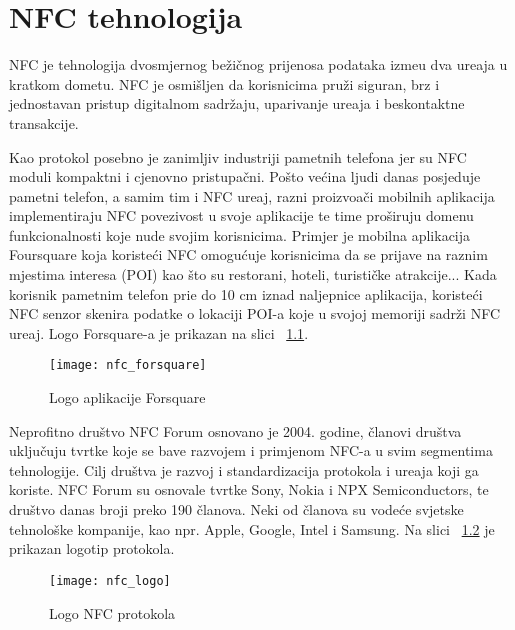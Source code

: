 
\chapter{NFC tehnologija}
NFC je tehnologija dvosmjernog be\v{z}i\v{c}nog prijenosa podataka izme\dj u dva ure\dj aja u kratkom dometu. NFC je osmi\v{s}ljen da korisnicima pru\v{z}i siguran, brz i jednostavan pristup digitalnom sadr\v{z}aju, uparivanje ure\dj aja i beskontaktne transakcije.

Kao protokol posebno je zanimljiv industriji pametnih telefona jer su NFC moduli kompaktni i cjenovno pristupa\v{c}ni. Po\v{s}to ve\'{c}ina ljudi danas posjeduje pametni telefon, a samim tim i NFC ure\dj aj, razni proizvo\dj a\v{c}i mobilnih aplikacija implementiraju NFC povezivost u svoje aplikacije te time pro\v{s}iruju domenu funkcionalnosti koje nude svojim korisnicima. Primjer je mobilna aplikacija Foursquare \cite{foursquare} koja koriste\'{c}i NFC omogu\'{c}uje korisnicima da se prijave na raznim mjestima interesa (POI) kao \v{s}to su restorani, hoteli, turisti\v{c}ke atrakcije... Kada korisnik pametnim telefon pri\dj e do 10 cm iznad naljepnice aplikacija, koriste\'{c}i NFC senzor skenira podatke o lokaciji POI-a koje u svojoj memoriji sadr\v{z}i NFC ure\dj aj. Logo Forsquare-a je prikazan na slici  ~\ref{fig:forsquare}.

\begin{figure}[!htbp]
	\begin{center}
 \texttt{[image: nfc\_forsquare]}
 \caption{Logo aplikacije Forsquare}
 \label{fig:forsquare}
	\end{center}
\end{figure}

Neprofitno dru\v{s}tvo NFC Forum \cite{nfc_forum}  osnovano je 2004. godine, \v{c}lanovi dru\v{s}tva uklju\v{c}uju tvrtke koje se bave razvojem i primjenom NFC-a u svim segmentima tehnologije. Cilj dru\v{s}tva je razvoj i standardizacija protokola i ure\dj aja koji ga koriste. NFC Forum su osnovale tvrtke Sony, Nokia i NPX Semiconductors, te dru\v{s}tvo danas broji preko 190 \v{c}lanova. Neki od \v{c}lanova su vode\'{c}e svjetske tehnolo\v{s}ke kompanije, kao npr. Apple, Google, Intel i Samsung. Na slici  ~\ref{fig:nfc} je prikazan logotip protokola.

\begin{figure}[!htbp]
	\begin{center}
 \texttt{[image: nfc\_logo]}
 \caption{Logo NFC protokola}
 \label{fig:nfc}
	\end{center}
\end{figure}

